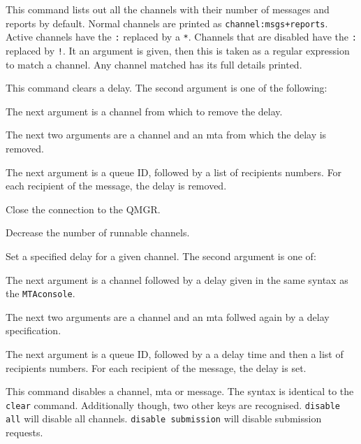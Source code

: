 \begin{describe}
\item[\verb|channel|:] This command lists out all the channels with
their number of messages and reports by default. Normal channels are
printed as \verb|channel:msgs+reports|. Active channels have the
\verb|:| replaced by a \verb|*|. Channels that are disabled have the
\verb|:| replaced by \verb|!|. It an argument is given, then this is
taken as a regular expression to match a channel. Any channel matched
has its full details printed.

\item[\verb|clear|:] This command clears a delay. The second argument
is one of the following:
\begin{describe}
\item[\verb|channel|:] The next argument is a channel from which
to remove the delay.
\item[\verb|mta|:] The next two arguments are a channel and an mta
from which the delay is removed.
\item[\verb|message|:] The next argument is a queue ID, followed by a
list of recipients numbers. For each recipient of the message, the
delay is removed.
\end{describe}

\item[\verb|close|:] Close the connection to the QMGR.

\item[\verb|decrease|:] Decrease the number of runnable channels.

\item[\verb|delay|:] Set a specified delay for a given channel. 
The second argument is one of:
\begin{describe}
\item[\verb|channel|:] The next argument is a channel followed by a
delay given in the same syntax as the \verb|MTAconsole|.
\item[\verb|mta|:] The next two arguments are a channel and an mta
follwed again by a delay specification.
\item[\verb|message|:] The next argument is a queue ID, followed by a
a delay time and then a list of recipients numbers. For each recipient
of the message, the delay is set.
\end{describe}

\item[\verb|disable|:] This command disables a channel, mta or
message. The syntax is identical to the \verb|clear| command.
Additionally though, two other keys are recognised. \verb|disable all|
will disable all channels. \verb|disable submission| will disable
submission requests.


\end{describe}

